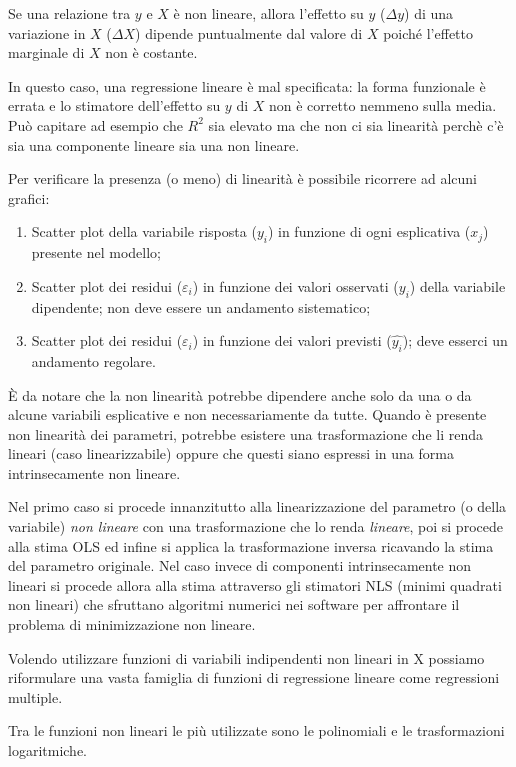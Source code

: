 \documentclass[a4page, 11pt]{article} %
\begin{document}
Se una relazione tra $y$ e $X$ è non lineare, allora l’effetto su $y$ ($\Delta y$)  di una variazione in $X$ ($\Delta X$) dipende puntualmente dal valore di $X$ poiché l’effetto marginale di $X$ non è costante. 

In questo caso, una regressione lineare è mal specificata: la forma funzionale è errata e lo stimatore dell’effetto su $y$ di $X$ non è corretto nemmeno sulla media. 
Può capitare ad esempio che $R^{2}$ sia elevato ma che non ci sia linearità perchè c'è sia una componente lineare sia una non lineare. 

Per verificare la presenza (o meno) di linearità è possibile ricorrere ad alcuni grafici: 
\begin{enumerate}[noitemsep]
\item Scatter plot della  variabile risposta ($y_i$) in funzione di ogni esplicativa ($x_j$) presente nel modello;
\item Scatter plot dei residui ($\varepsilon_i$) in funzione dei valori osservati ($y_i$) della variabile dipendente; non deve essere un andamento sistematico;
\item Scatter plot dei residui ($\varepsilon_i$) in funzione dei valori previsti ($\hat{y_i}$); deve esserci un andamento regolare.
\end{enumerate}
È da notare che la non linearità potrebbe dipendere anche solo da una o da alcune variabili esplicative e non necessariamente da tutte.
Quando è presente non linearità dei parametri, potrebbe esistere una trasformazione che li renda lineari (caso linearizzabile) oppure che questi siano espressi in una forma intrinsecamente non lineare.

Nel primo caso si procede innanzitutto alla linearizzazione del parametro (o della variabile) \textit{non lineare} con una trasformazione che lo renda \textit{lineare}, poi si procede alla stima OLS ed infine si applica la trasformazione inversa ricavando la stima del parametro originale. 
Nel caso invece di componenti intrinsecamente non lineari si procede allora alla stima attraverso gli stimatori NLS (minimi quadrati non lineari) che sfruttano algoritmi numerici nei software per affrontare il problema di minimizzazione non lineare.

Volendo utilizzare funzioni di variabili indipendenti non lineari in X possiamo riformulare una vasta famiglia di funzioni di regressione lineare come regressioni multiple.

Tra le funzioni non lineari le più utilizzate sono le polinomiali e le trasformazioni logaritmiche. 
\end{document}
